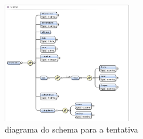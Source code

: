 \begin{figure}[htbp]
\begin{center}
\includegraphics[width=0.5\textwidth]{Images/tentativa_schema}
\caption{diagrama do schema para a tentativa}\label{fig xsd tentativa}
\end{center}
\end{figure}
